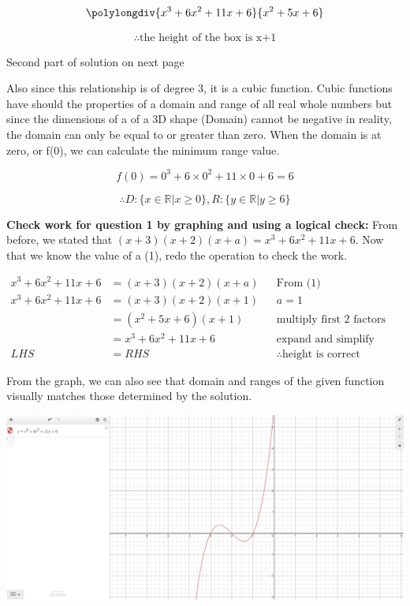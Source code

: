 \documentclass[12pt]{book}
\begin{document}
\begin{enumerate}
$$\polylongdiv{x^3+6x^2+11x+6}{x^2+5x+6}$$

    $$\boxed{\therefore \text{the height of the box is x+1}}$$
    \vspace{1cm}
    \begin{center}
        Second part of solution on next page
    \end{center}
    \newpage

    Also since this relationship is of degree 3, it is a cubic function. Cubic functions have should 
    the properties of a domain and range of all real whole numbers but since the dimensions of a 
    of a 3D shape (Domain) cannot be negative in reality, the domain can only be 
    equal to or greater than zero. When the domain is at zero, or f(0), we can calculate the 
    minimum range value. 

    $$f(0) = 0^3+6\times 0^2+11\times 0+6 = 6$$
   
    $$\boxed{\therefore D: \{ x \in \mathbb{R} | x \geq 0 \} , R: \{ y \in \mathbb{R} | y \geq 6 \}}$$

\vspace{1cm}
\textbf{Check work for question 1 by graphing and using a logical check:}
\vspace{1em}
From before, we stated that $(x+3)(x+2)(x+a) = x^3+6x^2+11x+6$. Now that we know the value of a (1), redo the operation to check the work.

\begin{align*}
    x^3+6x^2+11x+6 &= (x+3)(x+2)(x+a)&& \text{From (1)}\\
    x^3+6x^2+11x+6 &= (x+3)(x+2)(x+1) && a = 1\\
    &= (x^2+5x+6)(x+1) && \text{multiply first 2 factors and simplify} \\
    &= x^3+6x^2+11x+6 && \text{expand and simplify}\\
    LHS &= RHS && \therefore \text{height is correct}
\end{align*}

\vspace{1em}
From the graph, we can also see that domain and ranges of the given function 
visually matches those determined by the solution.

\vspace{1.5em}
\includegraphics[width=\linewidth]{a2-1 graph.PNG}


\end{enumerate}
\end{document}
